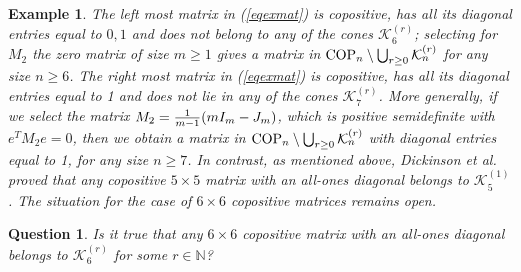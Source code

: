 \documentclass[11pt]{article}
\newcommand{\oN}{{\mathbb N}}
\newtheorem{question}[theorem]{Question}
\newtheorem{example}[theorem]{Example}
\numberwithin{equation}{section}
\newcommand{\COP}{{\text{\rm COP}}}
\newcommand{\MK}{{\mathcal K}}
\begin{document}
\begin{example}
The left most matrix in (\ref{eqexmat}) is  copositive, has all its diagonal entries equal to $0,1$ and does not belong to any of the cones $\MK^{(r)}_6$; selecting for $M_2$ the zero matrix of  size $m\ge 1$ gives  a matrix in $\COP_n\setminus \bigcup_{r\ge 0}\MK^{(r)}_n$ for any size $n\ge 6$.
The right most matrix in (\ref{eqexmat}) is  copositive,  has all its diagonal entries equal to 1 and  does not lie in any of the cones $\MK_7^{(r)}$.
More generally, if we  select the matrix $M_2= {1\over m-1}(mI_m-J_m)$, which is positive semidefinite with $e^TM_2e=0$, then we obtain a matrix in $\COP_n\setminus \bigcup_{r\ge 0} \MK^{(r)}_n$ with diagonal entries equal to 1, for any size $n\ge 7$.
In contrast, as mentioned above, Dickinson et al. \cite{DDGH} proved that any copositive $5\times 5$ matrix with an all-ones diagonal  belongs to $\MK_5^{(1)}$. 
The situation for the case of $6\times 6$ copositive matrices remains open.

\end{example}
\begin{question}
Is it true that any $6\times 6$ copositive matrix with an all-ones diagonal belongs to $\MK^{(r)}_6$ for some $r\in \oN$?
\end{question}
 
\end{document}
